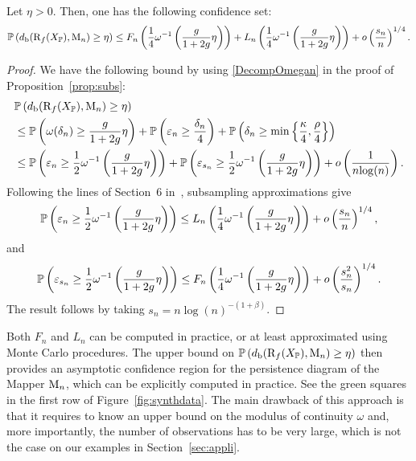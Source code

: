 \begin{prop}\label{prop:conf1}
Let $\eta >0$.
Then, one has the following confidence set:
$$\mathbb{P}\left(d_{\rm b}(\mathrm{R}_f(X_{\mathbb{P}}),\mathrm{M}_n)\geq \eta\right)\leq F_n\left(\frac{1}{4}\omega^{-1}\left(\frac{g}{1+2g}\eta\right)\right) 
+ L_n\left(\frac{1}{4}\omega^{-1}\left(\frac{g}{1+2g}\eta\right)\right) + o\left(\frac{s_n}{n}\right)^{1/4}.$$
\end{prop}

\begin{proof}
We have the following bound by using \eqref{DecompOmegan} in the proof of Proposition~\ref{prop:subs}:
\begin{align}
&\mathbb{P}\left(d_{\rm b}(\mathrm{R}_f(X_{\mathbb{P}}),\mathrm{M}_n)\geq\eta\right)\nonumber \\
&\leq\mathbb{P}\left(\omega(\delta_n)\geq \frac{g}{1+2g}\eta\right)+\mathbb{P}\left(\varepsilon_n\geq\frac{\delta_n}{4}\right)
+\mathbb{P}\left(\delta_n\geq\min\left\{\frac{\kappa}{4},\frac{\rho}{4}\right\}\right) \nonumber \\
&\leq\mathbb{P}\left(\varepsilon_n\geq \frac{1}{2}\omega^{-1}\left(\frac{g}{1+2g}\eta\right)\right)+
\mathbb{P}\left(\varepsilon_{s_n}\geq \frac{1}{2}\omega^{-1}\left(\frac{g}{1+2g}\eta\right)\right) + o\left(\frac{1}{n{\log}(n)}\right). \nonumber
\end{align}
Following the lines of Section~6 in~\cite{Fasy14}, subsampling approximations give
$$\mathbb{P}\left(\varepsilon_n\geq \frac{1}{2}\omega^{-1}\left(\frac{g}{1+2g}\eta\right)\right)\leq 
L_n\left(\frac{1}{4}\omega^{-1}\left(\frac{g}{1+2g}\eta\right)\right)+o\left(\frac{s_n}{n}\right)^{1/4},$$
and
$$\mathbb{P}\left(\varepsilon_{s_n}\geq \frac{1}{2}\omega^{-1}\left(\frac{g}{1+2g}\eta\right)\right)\leq 
F_n\left(\frac{1}{4}\omega^{-1}\left(\frac{g}{1+2g}\eta\right)\right)+o\left(\frac{s^2_n}{s_n}\right)^{1/4}.$$
The result follows by taking  $s_n=n{\log}(n)^{-(1+\beta)}$.
\end{proof}

Both $F_n$ and $L_n$ can be computed in practice, or at least approximated using Monte Carlo procedures.  
The upper bound on $ \mathbb{P}\left(d_{\rm b}(\mathrm{R}_f(X_{\mathbb{P}}),\mathrm{M}_n)\geq \eta\right)$  
then provides an asymptotic confidence region for the persistence diagram of the Mapper $\mathrm{M}_n$, 
which can be explicitly computed in practice. See the green squares in the first row of Figure~\ref{fig:synthdata}.
The main drawback of this approach is that it requires to know an upper bound on the modulus of continuity $\omega$
and, more importantly, the number of observations has to be very large, which is not the case on our examples in Section~\ref{sec:appli}.

